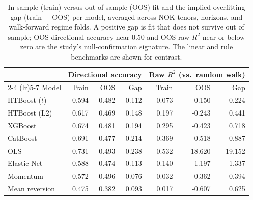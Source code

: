 \begin{table}[htbp]
\centering
\caption{In-sample (train) versus out-of-sample (OOS) fit and the implied overfitting gap (train $-$ OOS) per model, averaged across NOK tenors, horizons, and walk-forward regime folds. A positive gap is fit that does not survive out of sample; OOS directional accuracy near $0.50$ and OOS raw $R^2$ near or below zero are the study's null-confirmation signature. The linear and rule benchmarks are shown for contrast.}
\label{tab:is_fit}
\begin{tabular}{lrrrrrr}
\toprule
\multicolumn{1}{c}{} & \multicolumn{3}{c}{Directional accuracy} & \multicolumn{3}{c}{Raw $R^2$ (vs.\ random walk)} \\
\cmidrule(lr){2-4} \cmidrule(lr){5-7}
Model & Train & OOS & Gap & Train & OOS & Gap \\
\midrule
HTBoost ($t$) & 0.594 & 0.482 & 0.112 & 0.073 & -0.150 & 0.224 \\
HTBoost (L2) & 0.617 & 0.469 & 0.148 & 0.197 & -0.243 & 0.441 \\
XGBoost & 0.674 & 0.481 & 0.194 & 0.295 & -0.423 & 0.718 \\
CatBoost & 0.691 & 0.477 & 0.214 & 0.369 & -0.518 & 0.887 \\
OLS & 0.731 & 0.493 & 0.238 & 0.532 & -18.620 & 19.152 \\
Elastic Net & 0.588 & 0.474 & 0.113 & 0.140 & -1.197 & 1.337 \\
Momentum & 0.572 & 0.496 & 0.076 & 0.032 & -0.362 & 0.394 \\
Mean reversion & 0.475 & 0.382 & 0.093 & 0.017 & -0.607 & 0.625 \\
\bottomrule
\end{tabular}
\end{table}
